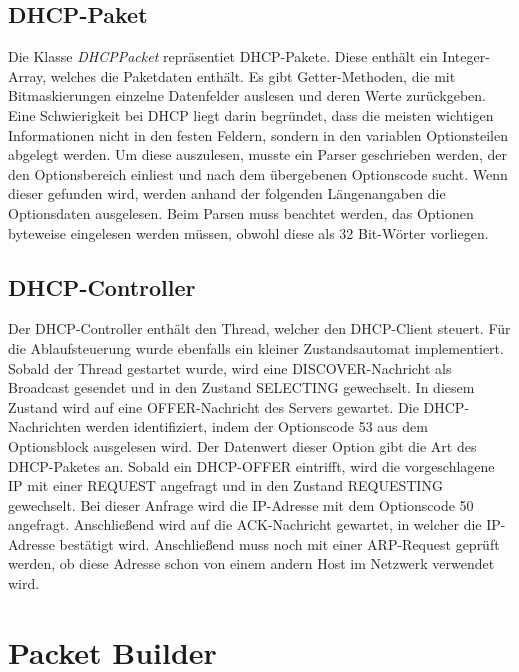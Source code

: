 \subsection{DHCP-Paket}
Die Klasse \textit{DHCPPacket} repräsentiet DHCP-Pakete. Diese enthält ein Integer-Array, welches die Paketdaten enthält. Es gibt Getter-Methoden, die mit Bitmaskierungen einzelne Datenfelder auslesen und deren Werte zurückgeben. Eine Schwierigkeit bei DHCP liegt darin begründet, dass die meisten wichtigen Informationen nicht in den festen Feldern, sondern in den variablen Optionsteilen abgelegt werden. Um diese auszulesen, musste ein Parser geschrieben werden, der den Optionsbereich einliest und nach dem übergebenen Optionscode sucht. Wenn dieser gefunden wird, werden anhand der folgenden Längenangaben die Optionsdaten ausgelesen. Beim Parsen muss beachtet werden, das Optionen byteweise eingelesen werden müssen, obwohl diese als 32 Bit-Wörter vorliegen. 

\subsection{DHCP-Controller}

Der DHCP-Controller enthält den Thread, welcher den DHCP-Client steuert. Für die Ablaufsteuerung wurde ebenfalls ein kleiner Zustandsautomat implementiert. Sobald der Thread gestartet wurde, wird eine DISCOVER-Nachricht als Broadcast gesendet und in den Zustand SELECTING gewechselt. In diesem Zustand wird auf eine OFFER-Nachricht des Servers gewartet. Die DHCP-Nachrichten werden identifiziert, indem der Optionscode 53 aus dem Optionsblock ausgelesen wird. Der Datenwert dieser Option gibt die Art des DHCP-Paketes an. Sobald ein DHCP-OFFER eintrifft, wird die vorgeschlagene IP mit einer REQUEST angefragt und in den Zustand REQUESTING gewechselt. Bei dieser Anfrage wird die IP-Adresse mit dem Optionscode 50 angefragt. Anschließend wird auf die ACK-Nachricht gewartet, in welcher die IP-Adresse bestätigt wird. Anschließend muss noch mit einer ARP-Request geprüft werden, ob diese Adresse schon von einem andern Host im Netzwerk verwendet wird. 

\section{Packet Builder}

